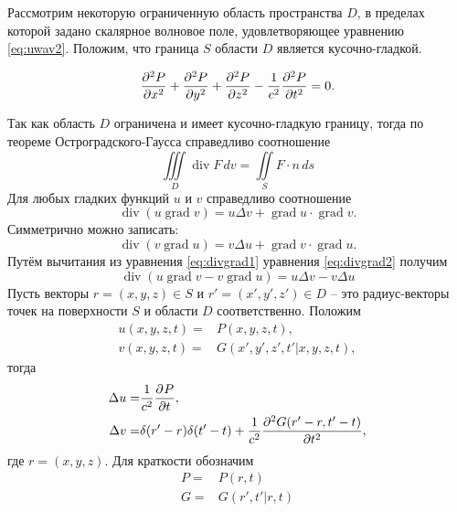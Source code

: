 \documentclass[a4paper, fontsize=14pt]{article}
\newcommand{\divop}{\operatorname{div}}
\newcommand{\gradop}{\operatorname{grad}}
\begin{document}
	Рассмотрим  некоторую ограниченную область пространства $D$, в пределах которой задано скалярное волновое поле, удовлетворяющее уравнению \ref{eq:uwav2}. Положим, что граница $S$ области $D$ является кусочно-гладкой.
	
	\begin{equation}
		\diff[2]{P}{x}  + \diff[2]{P}{y} +
		\diff[2]{P}{z}  - \frac{1}{c^2} \frac{\partial^2 P}{\partial
			t^2} = 0.
		\label{eq:uwav2}
	\end{equation}
	
	Так как область $D$ ограничена и имеет кусочно-гладкую границу, тогда по
	теореме Остроградского-Гаусса справедливо соотношение
	\begin{equation}
		\iiint\limits_D \divop F \, dv = \iint\limits_S F \cdot n \, ds 
		\label{eq:vgauss}
	\end{equation}
	Для любых гладких функций $u$ и $v$ справедливо соотношение 
	\begin{equation}
		\divop (u \gradop v) = u\Delta v + \gradop u \cdot \gradop v.
		\label{eq:divgrad1}
	\end{equation}
	Симметрично можно записать:
	\begin{equation}
		\divop (v \gradop u) = v\Delta u + \gradop v \cdot \gradop u.
		\label{eq:divgrad2}
	\end{equation}
	Путём вычитания из уравнения \ref{eq:divgrad1} уравнения \ref{eq:divgrad2} получим 
	\begin{equation}
		\divop (u \gradop v - v \gradop u)  = u\Delta v - v \Delta u
		\label{eq:divgraddiff}
	\end{equation}
	Пусть векторы $r = (x,y,z) \in S$ и $r' = (x',y',z') \in D$ -- это радиус-векторы точек на поверхности $S$ и области $D$ соответственно.
	Положим 
	\begin{eqnarray}
		u(x,y,z,t) =& P(x,y,z,t),\label{eq:subsu}\\
		v(x,y,z,t) = &G(x',y',z',t'|x,y,z,t),\label{eq:subsv}
	\end{eqnarray}	
	тогда 
\begin{eqnarray}
	\Delta u =& \frac{1}{c^2} \diff[]{P}{t},\label{eq:subsdu}\\
	\Delta v = &\delta (r' - r) \delta(t' - t) + \frac{1}{c^2} \diff [2]{G(r' -r,t'-t)}{t},\label{eq:subsdv}
\end{eqnarray}
где $r=(x,y,z)$. Для краткости обозначим
	\begin{align*}
		P =& P(r,t) \\
		G =& G(r',t'|r,t)
	\end{align*}
\end{document}
